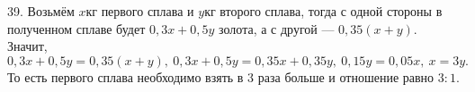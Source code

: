 39. Возьмём $x$кг первого сплава и $y$кг второго сплава, тогда с одной стороны в полученном сплаве будет $0,3x+0,5y$ золота, а с другой --- $0,35(x+y).$ Значит,
$0,3x+0,5y=0,35(x+y),\ 0,3x+0,5y=0,35x+0,35y,\ 0,15y=0,05x,\ x=3y.$ То есть первого сплава необходимо взять в 3 раза больше и отношение равно $3:1.$\\
